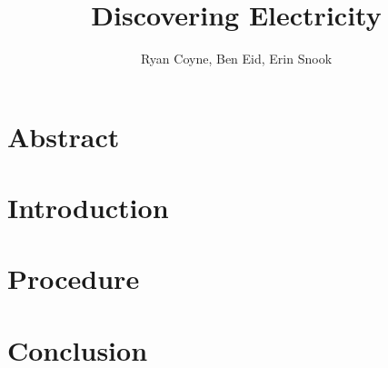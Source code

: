 \documentclass[12pt]{article}
\begin{document}
    \title{Discovering Electricity}
    \author{Ryan Coyne, Ben Eid, Erin Snook}
    \maketitle

    \section{Abstract}
        
    \section{Introduction}

    \section{Procedure}
    
    \section{Conclusion}
        
\end{document}
